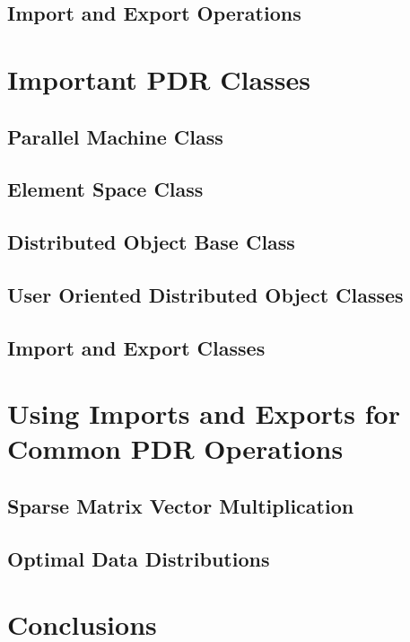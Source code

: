 \documentclass[12pt,relax]{OODataRedistribution}
\begin{document}
\subsection{Import and Export Operations}

\section{Important PDR Classes}

\subsection{Parallel Machine Class}

\subsection{Element Space Class}

\subsection{Distributed Object Base Class}

\subsection{User Oriented Distributed Object Classes}

\subsection{Import and Export Classes}


\section{Using Imports and Exports for Common PDR Operations}

\subsection{Sparse Matrix Vector Multiplication}

\subsection{Optimal Data Distributions}

\section{Conclusions}
\end{document}
